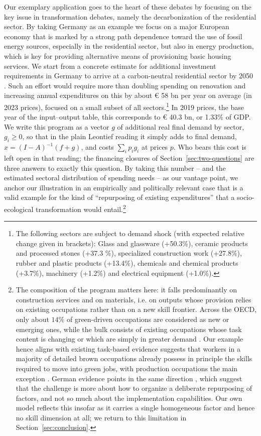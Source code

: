 Our exemplary application goes to the heart of these debates by focusing on the key issue in transformation debates, namely the decarbonization of the residential sector. By taking Germany as an example we focus on a major European economy that is marked by a strong path dependence toward the use of fossil energy sources, especially in the residential sector, but also in energy production, which is key for providing alternative means of provisioning basic housing services. We start from a concrete estimate for additional investment requirements in Germany to arrive at a carbon-neutral residential sector by 2050 \citep{Hornykewycz.2025}. Such an effort would require more than doubling spending on renovation and increasing annual expenditures on this by about € 58 bn per year on average (in 2023 prices), focused on a small subset of all sectors.\footnote{The following sectors are subject to demand shock (with expected relative change given in brackets): Glass and glassware (+50.3\%), ceramic products and processed stones (+37.3 \%), specialized construction work (+27.8\%), rubber and plastic products (+13.4\%), chemicals and chemical products (+3.7\%), machinery (+1.2\%) and electrical equipment (+1.0\%).} In 2019 prices, the base year of the input--output table, this corresponds to € 40.3 bn, or 1.33\% of GDP. We write this program as a vector $g$ of additional real final demand by sector, $g_i \geq 0$, so that in the plain Leontief reading it simply adds to final demand, $x = (I-A)^{-1}(f+g)$, and costs $\sum_i p_i g_i$ at prices $p$. Who bears this cost is left open in that reading; the financing closures of Section~\ref{sec:two-questions} are three answers to exactly this question. By taking this number -- and the estimated sectoral distribution of spending needs -- as our vantage point, we anchor our illustration in an empirically and politically relevant case that is a valid example for the kind of ``repurposing of existing expenditures'' that a socio-ecological transformation would entail.\footnote{The composition of the program matters here: it falls predominantly on construction services and on materials, i.e. on outputs whose provision relies on existing occupations rather than on a new skill frontier. Across the OECD, only about $14\%$ of green-driven occupations are considered as new or emerging ones, while the bulk consists of existing occupations whose task content is changing or which are simply in greater demand \citep{Bassanini.2024}. Our example hence aligns with existing task-based evidence suggests that workers in a majority of detailed brown occupations already possess in principle the skills required to move into green jobs, with production occupations the main exception \citep{Tyros.2023}. German evidence points in the same direction \citep[e.g][]{Bachmann.2026,Wehden.2026}, which suggest that the challenge is more about how to organize a deliberate repurposing of factors, and not so much about the implementation capabilities. Our own model reflects this insofar as it carries a single homogeneous factor and hence no skill dimension at all; we return to this limitation in Section~\ref{sec:conclusion}.}


